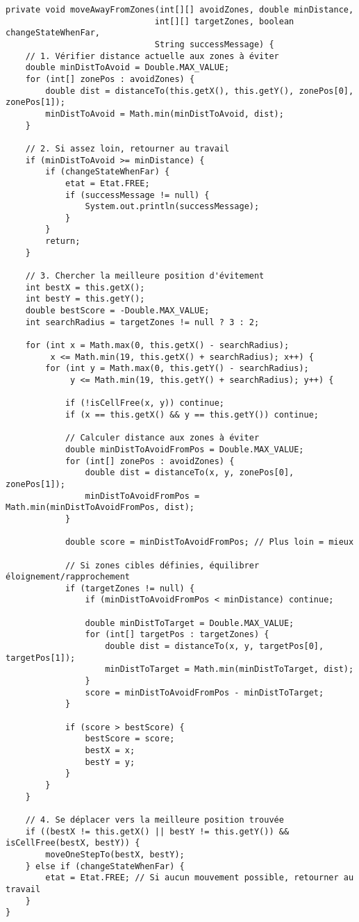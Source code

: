 \documentclass[12pt,a4paper]{article}
\begin{document}
\begin{lstlisting}[caption=Méthode générique d'évitement des zones]
private void moveAwayFromZones(int[][] avoidZones, double minDistance,
                              int[][] targetZones, boolean changeStateWhenFar,
                              String successMessage) {
    // 1. Vérifier distance actuelle aux zones à éviter
    double minDistToAvoid = Double.MAX_VALUE;
    for (int[] zonePos : avoidZones) {
        double dist = distanceTo(this.getX(), this.getY(), zonePos[0], zonePos[1]);
        minDistToAvoid = Math.min(minDistToAvoid, dist);
    }

    // 2. Si assez loin, retourner au travail
    if (minDistToAvoid >= minDistance) {
        if (changeStateWhenFar) {
            etat = Etat.FREE;
            if (successMessage != null) {
                System.out.println(successMessage);
            }
        }
        return;
    }

    // 3. Chercher la meilleure position d'évitement
    int bestX = this.getX();
    int bestY = this.getY();
    double bestScore = -Double.MAX_VALUE;
    int searchRadius = targetZones != null ? 3 : 2;

    for (int x = Math.max(0, this.getX() - searchRadius);
         x <= Math.min(19, this.getX() + searchRadius); x++) {
        for (int y = Math.max(0, this.getY() - searchRadius);
             y <= Math.min(19, this.getY() + searchRadius); y++) {

            if (!isCellFree(x, y)) continue;
            if (x == this.getX() && y == this.getY()) continue;

            // Calculer distance aux zones à éviter
            double minDistToAvoidFromPos = Double.MAX_VALUE;
            for (int[] zonePos : avoidZones) {
                double dist = distanceTo(x, y, zonePos[0], zonePos[1]);
                minDistToAvoidFromPos = Math.min(minDistToAvoidFromPos, dist);
            }

            double score = minDistToAvoidFromPos; // Plus loin = mieux

            // Si zones cibles définies, équilibrer éloignement/rapprochement
            if (targetZones != null) {
                if (minDistToAvoidFromPos < minDistance) continue;

                double minDistToTarget = Double.MAX_VALUE;
                for (int[] targetPos : targetZones) {
                    double dist = distanceTo(x, y, targetPos[0], targetPos[1]);
                    minDistToTarget = Math.min(minDistToTarget, dist);
                }
                score = minDistToAvoidFromPos - minDistToTarget;
            }

            if (score > bestScore) {
                bestScore = score;
                bestX = x;
                bestY = y;
            }
        }
    }

    // 4. Se déplacer vers la meilleure position trouvée
    if ((bestX != this.getX() || bestY != this.getY()) && isCellFree(bestX, bestY)) {
        moveOneStepTo(bestX, bestY);
    } else if (changeStateWhenFar) {
        etat = Etat.FREE; // Si aucun mouvement possible, retourner au travail
    }
}
\end{lstlisting}
\end{document}
